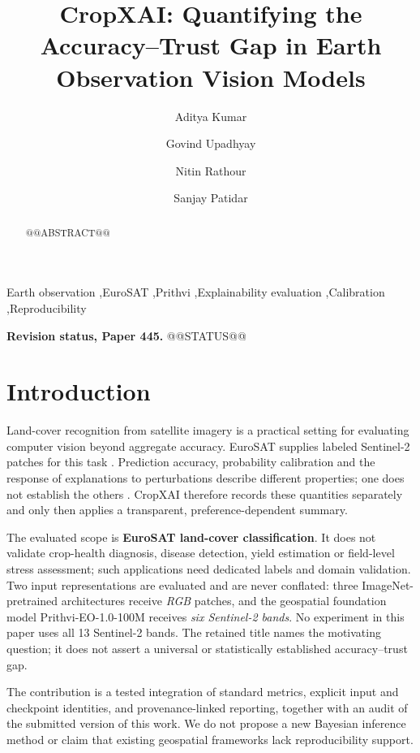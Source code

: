 \documentclass[3p,times,procedia]{elsarticle}
\begin{document}
\begin{frontmatter}
\title{CropXAI: Quantifying the Accuracy--Trust Gap in Earth Observation Vision Models}
\author{Aditya Kumar}\author{Govind Upadhyay}\author{Nitin Rathour}\author{Sanjay Patidar}
\address{Department of Software Engineering, Delhi Technological University, Delhi, India}
\begin{abstract}
@@ABSTRACT@@
\end{abstract}
\begin{keyword}Earth observation \sep EuroSAT \sep Prithvi \sep Explainability evaluation \sep Calibration \sep Reproducibility\end{keyword}
\end{frontmatter}

\noindent\textbf{Revision status, Paper 445.} @@STATUS@@

\section{Introduction}\label{sec:introduction}
Land-cover recognition from satellite imagery is a practical setting for evaluating computer vision beyond aggregate accuracy. EuroSAT supplies labeled Sentinel-2 patches for this task \cite{eurosat}. Prediction accuracy, probability calibration and the response of explanations to perturbations describe different properties; one does not establish the others \cite{calibration,rise}. CropXAI therefore records these quantities separately and only then applies a transparent, preference-dependent summary.

The evaluated scope is \textbf{EuroSAT land-cover classification}. It does not validate crop-health diagnosis, disease detection, yield estimation or field-level stress assessment; such applications need dedicated labels and domain validation. Two input representations are evaluated and are never conflated: three ImageNet-pretrained architectures receive \emph{RGB} patches, and the geospatial foundation model Prithvi-EO-1.0-100M receives \emph{six Sentinel-2 bands}. No experiment in this paper uses all 13 Sentinel-2 bands. The retained title names the motivating question; it does not assert a universal or statistically established accuracy--trust gap.

The contribution is a tested integration of standard metrics, explicit input and checkpoint identities, and provenance-linked reporting, together with an audit of the submitted version of this work. We do not propose a new Bayesian inference method or claim that existing geospatial frameworks lack reproducibility support.
\end{document}
